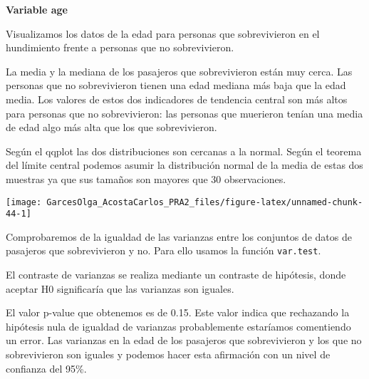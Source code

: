 \documentclass[
]{article}
\newenvironment{Shaded}{\begin{snugshade}}{\end{snugshade}}
\newcommand{\KeywordTok}[1]{\textcolor[rgb]{0.94,0.87,0.69}{#1}}
\newcommand{\NormalTok}[1]{\textcolor[rgb]{0.80,0.80,0.80}{#1}}
\newcommand{\OperatorTok}[1]{\textcolor[rgb]{0.94,0.94,0.82}{#1}}
\newcommand{\StringTok}[1]{\textcolor[rgb]{0.80,0.58,0.58}{#1}}
\begin{document}
\textbf{Variable age}

Visualizamos los datos de la edad para personas que sobrevivieron en el
hundimiento frente a personas que no sobrevivieron.

La media y la mediana de los pasajeros que sobrevivieron están muy
cerca. Las personas que no sobrevivieron tienen una edad mediana más
baja que la edad media. Los valores de estos dos indicadores de
tendencia central son más altos para personas que no sobrevivieron: las
personas que muerieron tenían una media de edad algo más alta que los
que sobrevivieron.

Según el qqplot las dos distribuciones son cercanas a la normal. Según
el teorema del límite central podemos asumir la distribución normal de
la media de estas dos muestras ya que sus tamaños son mayores que 30
observaciones.

\begin{Shaded}
\end{Shaded}

\begin{center}\texttt{[image: GarcesOlga\_AcostaCarlos\_PRA2\_files/figure-latex/unnamed-chunk-44-1]} \end{center}

Comprobaremos de la igualdad de las varianzas entre los conjuntos de
datos de pasajeros que sobrevivieron y no. Para ello usamos la función
\texttt{var.test}.

El contraste de varianzas se realiza mediante un contraste de hipótesis,
donde aceptar H0 significaría que las varianzas son iguales.

El valor p-value que obtenemos es de 0.15. Este valor indica que
rechazando la hipótesis nula de igualdad de varianzas probablemente
estaríamos comentiendo un error. Las varianzas en la edad de los
pasajeros que sobrevivieron y los que no sobrevivieron son iguales y
podemos hacer esta afirmación con un nivel de confianza del 95\%.

\begin{Shaded}
\end{Shaded}
\end{document}
